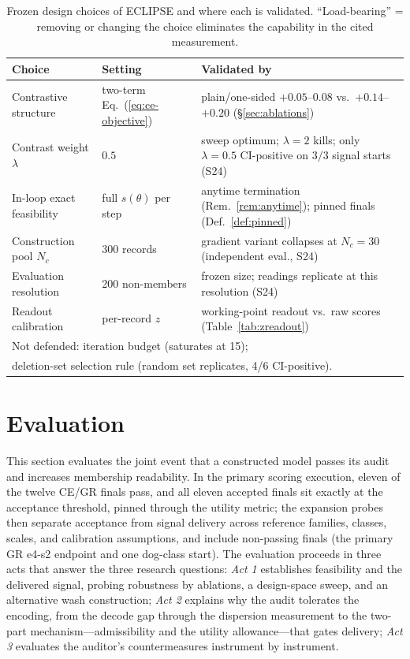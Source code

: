 \documentclass[lettersize,journal]{IEEEtran}
\begin{document}
\begin{table}[t]
\caption{Frozen design choices of ECLIPSE and where each is
validated. ``Load-bearing'' = removing or changing the choice
eliminates the capability in the cited measurement.}
\label{tab:design}
\centering
\footnotesize
\setlength{\tabcolsep}{3pt}
\begin{tabular}{p{24mm}p{14mm}p{30mm}}
\toprule
Choice & Setting & Validated by \\
\midrule
Contrastive structure & two-term Eq.~(\ref{eq:ce-objective}) & plain/one-sided $+0.05$--$0.08$ vs.\ $+0.14$--$+0.20$ (\S\ref{sec:ablations}) \\
Contrast weight $\lambda$ & $0.5$ & sweep optimum; $\lambda{=}2$ kills; only $\lambda{=}0.5$ CI-positive on $3/3$ signal starts (S24) \\ 
In-loop exact feasibility & full $s(\theta)$ per step & anytime termination (Rem.~\ref{rem:anytime}); pinned finals (Def.~\ref{def:pinned}) \\
Construction pool $N_c$ & 300 records & gradient variant collapses at $N_c{=}30$ (independent eval., S24) \\
Evaluation resolution & 200 non-members & frozen size; readings replicate at this resolution (S24) \\
Readout calibration & per-record $z$ & working-point readout vs.\ raw scores (Table~\ref{tab:zreadout}) \\
\midrule
\multicolumn{3}{l}{Not defended: iteration budget (saturates at 15);} \\
\multicolumn{3}{l}{deletion-set selection rule (random set replicates, 4/6 CI-positive).} \\
\bottomrule
\end{tabular}
\end{table}

\section{Evaluation}\label{sec:eval}
This section evaluates the joint event that a constructed
model passes its audit and increases membership readability.
In the primary scoring execution, eleven of the twelve CE/GR
finals pass, and all eleven accepted finals sit exactly at the
acceptance threshold, pinned through the utility metric; the
expansion probes then separate acceptance from signal delivery
across reference families, classes, scales, and calibration
assumptions, and include non-passing finals (the primary GR
e4-s2 endpoint and one dog-class start). The evaluation
proceeds in three acts that answer the three research
questions: \emph{Act 1} establishes feasibility and the
delivered signal, probing robustness by ablations, a
design-space sweep, and an alternative wash construction;
\emph{Act 2} explains why the audit tolerates the encoding,
from the decode gap through the dispersion measurement to the
two-part mechanism---admissibility and the utility
allowance---that gates delivery; \emph{Act 3} evaluates the
auditor's countermeasures instrument by instrument.
\end{document}
